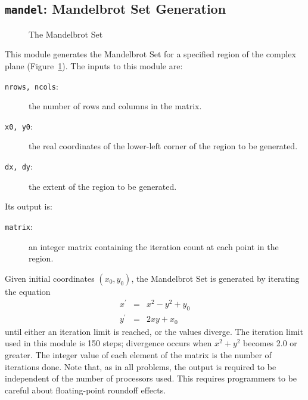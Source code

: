 \subsection{{\tt{mandel}}:
	Mandelbrot Set Generation
	\label{s:toys-mandel}}

\begin{figure}
\caption{The Mandelbrot Set\label{f:mandel}}
\end{figure}

This module generates the Mandelbrot Set
for a specified region of the complex plane
(Figure~\ref{f:mandel}).
The inputs to this module are:
\begin{description}
\item[{\tt{nrows, ncols}}:]
	the number of rows and columns in the matrix.
\item[{\tt{x0, y0}}:]
	the real coordinates of the lower-left corner
	of the region to be generated.
\item[{\tt{dx, dy}}:]
	the extent of the region to be generated.
\end{description}
Its output is:
\begin{description}
\item[{\tt{matrix}}:]
	an integer matrix containing the iteration count at each point in the region.
\end{description}

Given initial coordinates $(x_0, y_0)$,
the Mandelbrot Set is generated by iterating the equation
\begin{eqnarray*}
x^{\prime}	& =	& x^2 - y^2 + y_0	\\
y^{\prime}	& =	& 2{x}{y} + x_0
\end{eqnarray*}
until either an iteration limit is reached,
or the values diverge.
The iteration limit used in this module is 150 steps;
divergence occurs when $x^2 + y^2$ becomes 2.0 or greater.
The integer value of each element of the matrix is
the number of iterations done.
Note that,
as in all problems,
the output is required to be
independent of the number of processors used.
This requires programmers to be careful about
floating-point roundoff effects.
